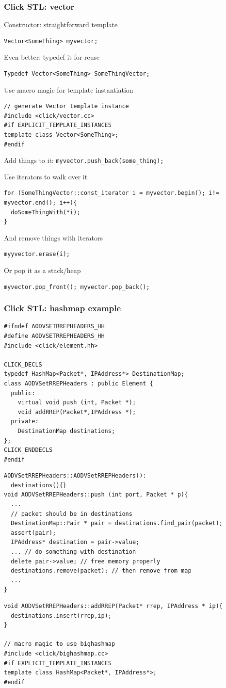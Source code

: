 \documentclass{beamer}
\begin{document}
\begin{frame}
\frametitle{Click STL: vector}
Constructor: straightforward template
\begin{lstlisting}
Vector<SomeThing> myvector;
\end{lstlisting}
Even better: typedef it for reuse
\begin{lstlisting}
Typedef Vector<SomeThing> SomeThingVector; 
\end{lstlisting}
Use macro magic for template instantiation
\begin{lstlisting}
// generate Vector template instance
#include <click/vector.cc>
#if EXPLICIT_TEMPLATE_INSTANCES
template class Vector<SomeThing>;
#endif
\end{lstlisting}
Add things to it: \lstinline!myvector.push_back(some_thing);!

Use iterators to walk over it
\begin{lstlisting}
for (SomeThingVector::const_iterator i = myvector.begin(); i!= myvector.end(); i++){
  doSomeThingWith(*i);  
}
\end{lstlisting}
And remove things with iterators
\begin{lstlisting}
myyvector.erase(i);
\end{lstlisting}
Or pop it as a stack/heap
\begin{lstlisting}
myvector.pop_front(); myvector.pop_back();
\end{lstlisting}
\end{frame}

\begin{frame}
\frametitle{Click STL: hashmap example}
\begin{lstlisting}
#ifndef AODVSETRREPHEADERS_HH
#define AODVSETRREPHEADERS_HH
#include <click/element.hh>

CLICK_DECLS
typedef HashMap<Packet*, IPAddress*> DestinationMap;
class AODVSetRREPHeaders : public Element { 
  public:
    virtual void push (int, Packet *);
    void addRREP(Packet*,IPAddress *);
  private:
    DestinationMap destinations;
};
CLICK_ENDDECLS
#endif
\end{lstlisting}
\begin{lstlisting}
AODVSetRREPHeaders::AODVSetRREPHeaders(): 
  destinations(){}
void AODVSetRREPHeaders::push (int port, Packet * p){
  ...
  // packet should be in destinations
  DestinationMap::Pair * pair = destinations.find_pair(packet);
  assert(pair);
  IPAddress* destination = pair->value;
  ... // do something with destination
  delete pair->value; // free memory properly
  destinations.remove(packet); // then remove from map
  ...
}
\end{lstlisting}
\begin{lstlisting}
void AODVSetRREPHeaders::addRREP(Packet* rrep, IPAddress * ip){
  destinations.insert(rrep,ip);
}

// macro magic to use bighashmap
#include <click/bighashmap.cc>
#if EXPLICIT_TEMPLATE_INSTANCES
template class HashMap<Packet*, IPAddress*>;
#endif
\end{lstlisting}
\end{frame}
\end{document}
